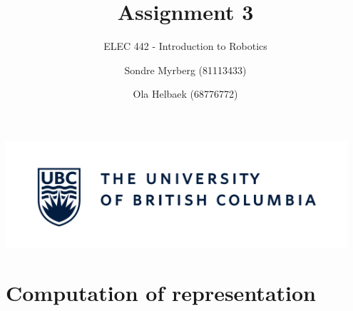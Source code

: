 \documentclass[a4paper]{scrartcl}
\title{Assignment 3}
\subtitle{ELEC 442 - Introduction to Robotics}
\author{Sondre Myrberg (81113433) \and Ola Helbaek (68776772)}
\begin{document}
\hypersetup{pageanchor=false}
\begin{titlepage}
    \maketitle
    \vfill
    \vfill
    \vfill
    \vfill
    \includegraphics[width=0.95\textwidth]{../../ubc_logo.pdf}
    \vfill
    \vfill
\end{titlepage}
\hypersetup{pageanchor=true}

\section{Computation of representation}
\end{document}
